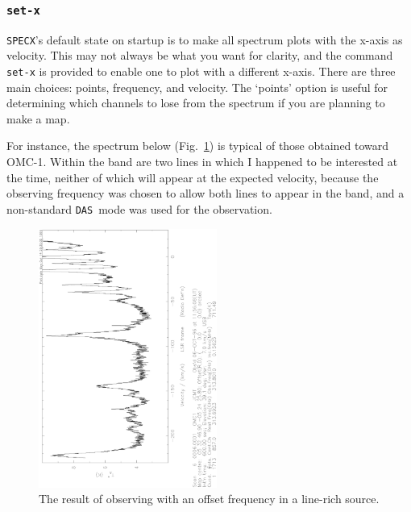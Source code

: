 \documentclass[11pt,twoside]{article}
\newcommand{\SPECX}{{\tt SPECX}}
\newcommand{\das}{{\tt DAS}}
\begin{document}
\subsubsection{{\tt set-x}}
\label{sec:set-x}
\SPECX 's default state on startup is to make all spectrum plots with
the x-axis as velocity. This may not always be what you want for
clarity, and the command {\tt set-x} is provided to enable one to plot
with a different x-axis. There are three main choices: points,
frequency, and velocity. The `points' option is useful for determining
which channels to lose from the spectrum if you are planning to make a
map.

For instance, the spectrum below (Fig.~\ref{fig:set-x-orig})
is typical of those obtained toward
OMC-1. Within the band are two lines in which I happened to be
interested at the time, neither of which will appear at the expected
velocity, because the observing frequency was chosen to allow both
lines to appear in the band, and a non-standard \das\ mode was used
for the observation.

\begin{figure}[ht]
\begin{minipage}[t]{\textwidth}
\begin{minipage}[b]{0.5\textwidth}
\centering
\includegraphics[angle=-90,width=2.3in]{sc8_hdo-orig.ps}
\end{minipage}
\hfill
\begin{minipage}[b]{0.45\textwidth}
\caption[A messy spectrum]
{\small{The result of observing with an offset frequency in a
line-rich source.
\vspace*{2cm}
}}
\label{fig:set-x-orig}
\end{minipage}
\end{minipage}
\end{figure}
\end{document}
